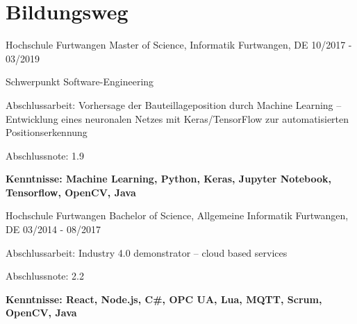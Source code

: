 
\section{Bildungsweg}
\cventry
{Hochschule Furtwangen} %
{Master of Science, Informatik} %
{Furtwangen, DE} %
{10/2017 - 03/2019} %
\begin{cvitems}
\item Schwerpunkt Software-Engineering
\item Abschlussarbeit: Vorhersage der Bauteillageposition durch Machine Learning -- Entwicklung eines neuronalen Netzes mit Keras/TensorFlow zur automatisierten Positionserkennung
\item Abschlussnote: 1.9
\item[] \textbf{Kenntnisse: Machine Learning, Python, Keras, Jupyter Notebook, Tensorflow, OpenCV, Java}
\end{cvitems}

\cventry
{Hochschule Furtwangen} %
{Bachelor of Science, Allgemeine Informatik} %
{Furtwangen, DE} %
{03/2014 - 08/2017} %
\begin{cvitems}
\item Abschlussarbeit: Industry 4.0 demonstrator – cloud based services
\item Abschlussnote: 2.2
\item[] \textbf{Kenntnisse: React, Node.js, C\#, OPC UA, Lua, MQTT, Scrum, OpenCV, Java}
\end{cvitems}
